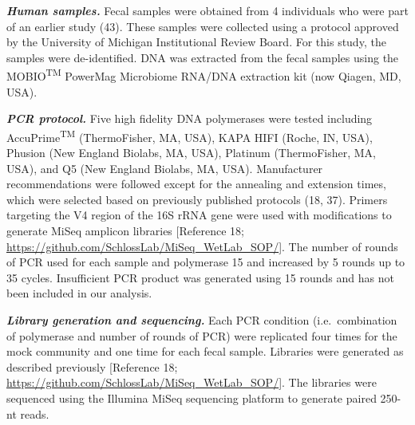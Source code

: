 \documentclass[11,]{article}
\begin{document}
\textbf{\emph{Human samples.}} Fecal samples were obtained from 4
individuals who were part of an earlier study (43). These samples were
collected using a protocol approved by the University of Michigan
Institutional Review Board. For this study, the samples were
de-identified. DNA was extracted from the fecal samples using the
MOBIO\textsuperscript{TM} PowerMag Microbiome RNA/DNA extraction kit
(now Qiagen, MD, USA).

\textbf{\emph{PCR protocol.}} Five high fidelity DNA polymerases were
tested including AccuPrime\textsuperscript{TM} (ThermoFisher, MA, USA),
KAPA HIFI (Roche, IN, USA), Phusion (New England Biolabs, MA, USA),
Platinum (ThermoFisher, MA, USA), and Q5 (New England Biolabs, MA, USA).
Manufacturer recommendations were followed except for the annealing and
extension times, which were selected based on previously published
protocols (18, 37). Primers targeting the V4 region of the 16S rRNA gene
were used with modifications to generate MiSeq amplicon libraries
{[}Reference 18;
\url{https://github.com/SchlossLab/MiSeq_WetLab_SOP/}{]}. The number of
rounds of PCR used for each sample and polymerase 15 and increased by 5
rounds up to 35 cycles. Insufficient PCR product was generated using 15
rounds and has not been included in our analysis.

\textbf{\emph{Library generation and sequencing.}} Each PCR condition
(i.e.~combination of polymerase and number of rounds of PCR) were
replicated four times for the mock community and one time for each fecal
sample. Libraries were generated as described previously {[}Reference
18; \url{https://github.com/SchlossLab/MiSeq_WetLab_SOP/}{]}. The
libraries were sequenced using the Illumina MiSeq sequencing platform to
generate paired 250-nt reads.
\end{document}
